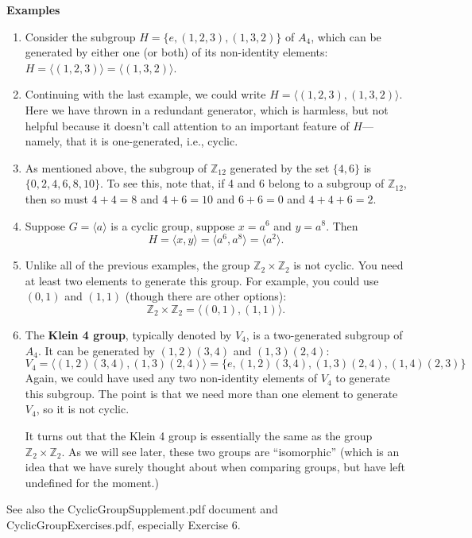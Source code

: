 \documentclass[12pt]{article}
\newcommand{\Z} {{\mathbb Z}}
\newcommand{\<}{\ensuremath{\langle}}
\renewcommand{\>}{\ensuremath{\rangle}}
\theoremstyle{plain}
\theoremstyle{definition}
\begin{document}
{\bf Examples}
\begin{enumerate}
\item 
Consider the subgroup $H = \{e, (1,2,3), (1,3,2)\}$ of $A_4$,
which can be generated by either one (or both)
of its non-identity elements:
$H = \<(1,2,3)\> = \<(1,3,2)\>$.

\item
Continuing with the last example, we could write $H = \<(1,2,3), (1,3,2)\>$.
Here we have thrown in a redundant generator, which is harmless, but not helpful
because it doesn't call attention to an important feature of $H$---namely, that it is
one-generated, i.e., cyclic.

\item As mentioned above, the subgroup of $\Z_{12}$ generated by the set $\{4, 6\}$ is 
$\{0, 2, 4, 6, 8, 10\}$.
To see this, note that, if 4 and 6 belong to a
subgroup of $\Z_{12}$, then so must $4+4=8$ and $4+6=10$ and $6+6=0$ and
$4+4+6=2$.

\item 
Suppose $G = \<a\>$ is a cyclic group, suppose $x = a^6$ and $y = a^8$.
Then 
\[
H = \<x, y\> = \<a^6, a^8\> = \<a^2\>.
\]

\item
Unlike all of the previous examples, the group $\Z_2 \times \Z_2$ is not cyclic.
You need at least two elements to generate this group.  For example, you could
use $(0,1)$ and $(1,1)$ (though there are other options):
\[
\Z_2 \times \Z_2 = \<(0,1), (1,1)\>.
\]

\item
The {\bf Klein 4 group}, typically denoted by $V_4$, is a two-generated subgroup of $A_4$.
It can be generated by $(1,2)(3,4)$ and $(1,3)(2,4)$:
\[
V_4 = \<(1,2)(3,4), (1,3)(2,4)\> = \{e, (1,2)(3,4), (1,3)(2,4), (1,4)(2,3)\}
\]
Again, we could have used any two non-identity elements of $V_4$
to generate this subgroup. The point is that we need more than one element to
generate $V_4$, so it is not cyclic.

It turns out that the Klein 4 group is essentially the same
 as the group $\Z_2 \times \Z_2$. As we will see later, these two groups are
 ``isomorphic'' (which is an  idea that we have surely thought about when
 comparing groups, but have left undefined for the moment.)

\end{enumerate}
See also the CyclicGroupSupplement.pdf document and CyclicGroupExercises.pdf,
especially Exercise 6.
\end{document}
